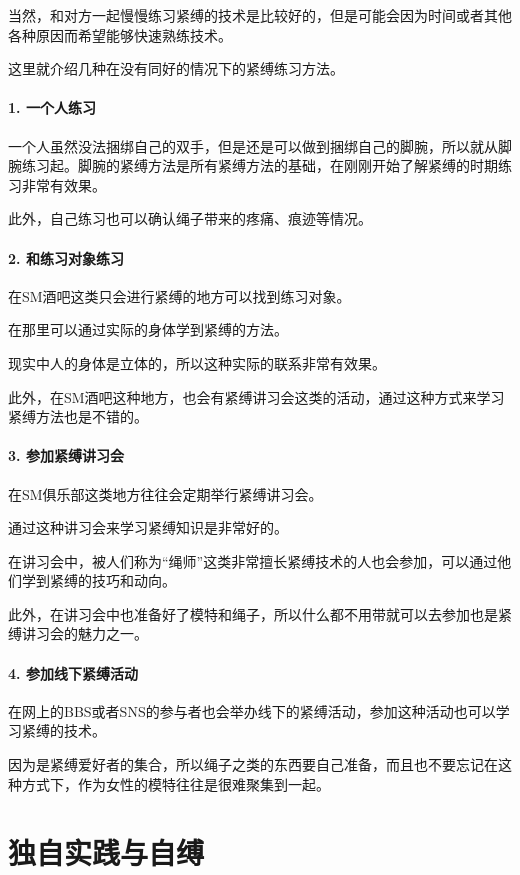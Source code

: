 \documentclass[12pt,UTF8]{ctexbook}
\begin{document}
当然，和对方一起慢慢练习紧缚的技术是比较好的，但是可能会因为时间或者其他各种原因而希望能够快速熟练技术。

这里就介绍几种在没有同好的情况下的紧缚练习方法。

\paragraph{1. 一个人练习}

一个人虽然没法捆绑自己的双手，但是还是可以做到捆绑自己的脚腕，所以就从脚腕练习起。脚腕的紧缚方法是所有紧缚方法的基础，在刚刚开始了解紧缚的时期练习非常有效果。

此外，自己练习也可以确认绳子带来的疼痛、痕迹等情况。

\paragraph{2. 和练习对象练习}

在SM酒吧这类只会进行紧缚的地方可以找到练习对象。

在那里可以通过实际的身体学到紧缚的方法。

现实中人的身体是立体的，所以这种实际的联系非常有效果。

此外，在SM酒吧这种地方，也会有紧缚讲习会这类的活动，通过这种方式来学习紧缚方法也是不错的。

\paragraph{3. 参加紧缚讲习会}

在SM俱乐部这类地方往往会定期举行紧缚讲习会。

通过这种讲习会来学习紧缚知识是非常好的。

在讲习会中，被人们称为“绳师”这类非常擅长紧缚技术的人也会参加，可以通过他们学到紧缚的技巧和动向。

此外，在讲习会中也准备好了模特和绳子，所以什么都不用带就可以去参加也是紧缚讲习会的魅力之一。

\paragraph{4. 参加线下紧缚活动}

在网上的BBS或者SNS的参与者也会举办线下的紧缚活动，参加这种活动也可以学习紧缚的技术。

因为是紧缚爱好者的集合，所以绳子之类的东西要自己准备，而且也不要忘记在这种方式下，作为女性的模特往往是很难聚集到一起。

\section{独自实践与自缚}
\end{document}
